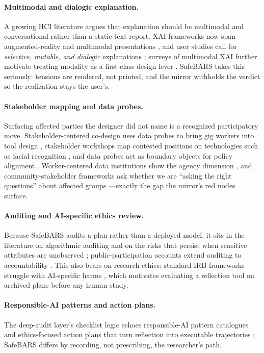 \documentclass[sigconf,screen]{acmart}
\begin{document}
\paragraph{Multimodal and dialogic explanation.}
A growing HCI literature argues that explanation should be multimodal and
conversational rather than a static text report. XAI frameworks now span
augmented-reality and multimodal presentations \citep{xu2023xair}, and user
studies call for \emph{selective, mutable, and dialogic} explanations
\citep{bertrand2023xai}; surveys of multimodal XAI further motivate treating
modality as a first-class design lever \citep{rodis2024mxai}. SafeBARS takes
this seriously: tensions are rendered, not printed, and the mirror withholds
the verdict so the realization stays the user's.

\paragraph{Stakeholder mapping and data probes.}
Surfacing affected parties the designer did not name is a recognized
participatory move. Stakeholder-centered co-design uses data probes to bring
gig workers into tool design \citep{zhang2023stakeholder}, stakeholder
workshops map contested positions on technologies such as facial recognition
\citep{ullstein2024frt}, and data probes act as boundary objects for policy
alignment \citep{zhang2024dataprobes}. Worker-centered data institutions show
the agency dimension \citep{stein2023worker}, and community-stakeholder
frameworks ask whether we are ``asking the right questions'' about affected
groups \citep{haque2024questions}---exactly the gap the mirror's red nodes
surface.

\paragraph{Auditing and AI-specific ethics review.}
Because SafeBARS audits a plan rather than a deployed model, it sits in the
literature on algorithmic auditing \citep{groves2024auditing} and on the
risks that persist when sensitive attributes are unobserved
\citep{cheng2023redundant,jaime2024ethnic}; public-participation accounts
extend auditing to accountability \citep{groves2023goingpublic}. This also
bears on research ethics: standard IRB frameworks struggle with AI-specific
harms \citep{bouhouita2023challenges,resnik2024ethicsai}, which motivates
evaluating a reflection tool on archived plans before any human study.

\paragraph{Responsible-AI patterns and action plans.}
The deep-audit layer's checklist logic echoes responsible-AI pattern
catalogues \citep{lu2024pattern} and ethics-focused action plans that turn
reflection into executable trajectories
\citep{gray2024actionplan,iliadis2024gfa}; SafeBARS differs by recording, not
prescribing, the researcher's path.
\end{document}

